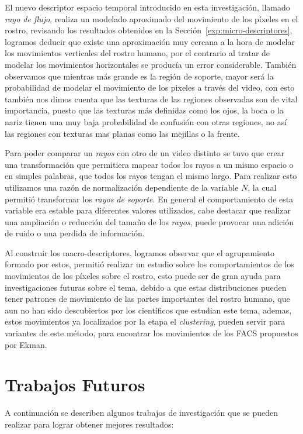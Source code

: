 El nuevo descriptor espacio temporal introducido en esta investigación, llamado \textit{rayo de flujo}, realiza un modelado aproximado del movimiento de los píxeles en el rostro, revisando los resultados obtenidos en la Sección~\ref{exp:micro-descriptores}, logramos deducir que existe una aproximación muy cercana a la hora de modelar los movimientos verticales del rostro humano, por el contrario al tratar de modelar los movimientos horizontales se producía un error considerable. También observamos que mientras más grande es la región de soporte, mayor será la probabilidad de modelar el movimiento de los pixeles a través del video, con esto también nos dimos cuenta que las texturas de las regiones observadas son de vital importancia, puesto que las texturas más definidas como los ojos, la boca o la nariz tienen una muy baja probabilidad de confusión con otras regiones, no así las regiones con texturas mas planas como las mejillas o la frente.

Para poder comparar un \textit{rayos} con otro de un video distinto se tuvo que crear una transformación que permitiera mapear todos los rayos a un mismo espacio o en simples palabras, que todos los rayos tengan el mismo largo. Para realizar esto utilizamos una razón de normalización dependiente de la variable $N$, la cual permitió transformar los \textit{rayos de soporte}. En general el comportamiento de esta variable era estable para diferentes valores utilizados, cabe destacar que realizar una ampliación o reducción del tamaño de los \textit{rayos}, puede provocar una adición de ruido o  una perdida de información. 

Al construir los macro-descriptores, logramos observar que el agrupamiento formado por estos, permitió realizar un estudio sobre los comportamientos de los movimientos de los píxeles sobre el rostro, esto puede ser de gran ayuda para investigaciones futuras sobre el tema, debido a que estas distribuciones pueden tener patrones de movimiento de las partes importantes del rostro humano, que aun no han sido descubiertos por los científicos que estudian este tema, ademas, estos movimientos ya localizados por la etapa el \textit{clustering}, pueden servir para variantes de este método, para encontrar los movimientos de los FACS propuestos por Ekman.

\section{Trabajos Futuros}

A continuación se describen algunos trabajos de investigación que se pueden realizar para lograr obtener mejores resultados:

